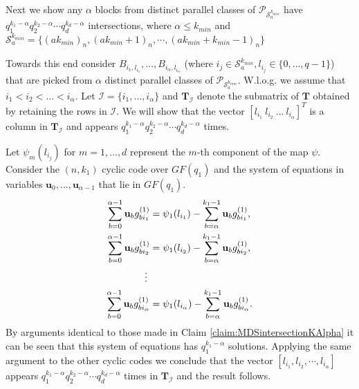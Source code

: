 \documentclass[journal,twocolumn]{IEEEtran}
\theoremstyle{definition}
\newcommand{\calP}{\mathcal{P}}
\newcommand{\calS}{\mathcal{S}}
\newcommand{\calI}{\mathcal{I}}
\newcommand{\bfu}{\mathbf{u}}
\newcommand{\bfT}{\mathbf{T}}
\newcommand{\litang}[1]{\marginpar{+}{\bf Li's remark}: {\em #1}}
\begin{document}


Next we show any $\alpha$ blocks from distinct parallel classes of $\calP_{\calS_{a}^{k_{min}}}$  have $q_1^{k_1-\alpha}q_2^{k_2-\alpha}\cdots q_{d}^{k_d-\alpha}$ intersections, where $\alpha\le k_{min}$ and ${\calS^{k_{min}}_a}=\{(ak_{min})_n, (ak_{min}+1)_n,\cdots,(ak_{min}+k_{min}-1)_n\}$

Towards this end consider $B_{i_1, l_{i_1}}, \dots, B_{i_{\alpha}, l_{i_{\alpha}}}$ (where $i_j \in \calS^{k_{min}}_a, l_{i_j} \in \{0, \dots, q-1\}$) that are picked from $\alpha$ distinct parallel classes of  $\calP_{\calS^{k_{min}}_a}$. W.l.o.g. we assume that $i_1 < i_2 < \dots < i_{\alpha}$. Let $\calI =  \{i_1, \dots, i_{\alpha}\}$ and $\bfT_{\calI}$ denote the submatrix of $\bfT$ obtained by retaining the rows in $\calI$. We will show that the vector $[l_{i_1}~l_{i_2}~\dots~l_{i_{\alpha}}]^T$ is a column in $\bfT_{\calI}$ and appears $q_1^{k_1-\alpha}q_2^{k_2-\alpha}\cdots q_{d}^{k_d-\alpha}$ times.

Let $\psi_m(l_{i_j})$ for $m = 1, \dots, d$ represent the $m$-th component of the map $\psi$. Consider the $(n,k_1)$ cyclic code over $GF(q_1)$ and the system of equations in variables $\bfu_0, \dots, \bfu_{\alpha-1}$ that lie in $GF(q_1)$.
\begin{align*}
\sum_{b=0}^{\alpha-1}\bfu_{b}g_{bi_1}^{(1)}&= \psi_1(l_{i_1})-\sum_{b=\alpha}^{k_1-1}\bfu_{b}g_{bi_1}^{(1)},\\
\sum_{b=0}^{\alpha-1}\bfu_{b}g_{bi_2}^{(1)} &= \psi_1(l_{i_2})-\sum_{b=\alpha}^{k_1-1}\bfu_{b}g_{bi_2}^{(1)},\\
\mathrel{\makebox[\widthof{=}]{\vdots}}\\
\sum_{b=0}^{\alpha-1}\bfu_{b}g_{bi_{\alpha}}^{(1)} &= \psi_1(l_{i_{\alpha}})-\sum_{b=\alpha}^{k_1-1}\bfu_{b}g_{bi_{\alpha}}^{(1)}.
\end{align*}
By arguments identical to those made in Claim \ref{claim:MDSintersectionKAlpha} it can be seen that this system of equations has $q_1^{k_1-\alpha}$ solutions. Applying the same argument to the other cyclic codes we conclude that the vector $[l_{i_1},l_{i_2},\cdots, l_{i_{\alpha}}]$ appears $q_1^{k_1-\alpha}q_2^{k_2-\alpha}\cdots q_{d}^{k_d-\alpha}$ times in $\bfT_{\calI}$ and the result follows. %
\end{document}

